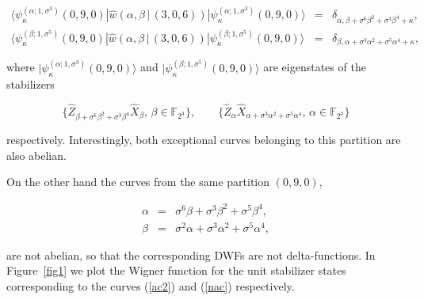 \documentclass[quantumrep,article,submit,pdftex,moreauthors]{Definitions/mdpi}
\begin{document}
\begin{eqnarray}
  \langle \psi_{\kappa}^{(\alpha ; 1,\sigma^{3})}(0,9,0)
  |\hat{w}\left(\alpha,\beta \, | \, (3,0,6)\right)
  |\psi_{\kappa}^{(\alpha ; 1,\sigma^{3})}(0,9,0)\rangle
  &=& \delta_{\alpha,\beta + \sigma^{6}\beta^{2} + \sigma^{3} \beta^{4} +
  \kappa}, \\
  \langle \psi_{\kappa }^{(\beta ; 1,\sigma^{5})}(0,9,0)
  |\hat{w}\left(\alpha,\beta \, | \, (3,0,6)\right)
  |\psi_{\kappa}^{(\beta ; 1,\sigma^{5})}(0,9,0)\rangle
  &=& \delta_{\beta,\alpha + \sigma^{3}\alpha^{2} + \sigma^{5} \alpha^{4} +
  \kappa },
  \label{ac2 delta}
\end{eqnarray}

where $|\psi_{\kappa}^{(\alpha ; 1,\sigma^{3})}(0,9,0)\rangle$ and
$|\psi_{\kappa }^{(\beta ; 1,\sigma^{5})}(0,9,0)\rangle$ are eigenstates of the
stabilizers 

\begin{equation*}
	\{\hat{Z}_{\beta +\sigma ^{6}\beta ^{2}+\sigma^{3}\beta^{4}}
\hat{X}_{\beta }, \, \beta \in \mathbb{F}_{2^{3}}\},
\qquad \{\hat{Z}_{\alpha } \hat{X}_{\alpha + \sigma^{3}\alpha^{2} +
	\sigma^{5}\alpha^{4}}, \, \alpha \in
\mathbb{F}_{2^{3}}\}
\end{equation*}

respectively. Interestingly, both exceptional curves
belonging to this partition are also abelian.

On the other hand the curves from the same partition $(0,9,0)$,

\begin{eqnarray}
  \alpha &=&\sigma^{6}\beta +\sigma ^{3}\beta ^{2}+\sigma ^{5}\beta ^{4},
  \label{nac1} \\
  \beta &=&\sigma^{2}\alpha +\sigma ^{3}\alpha ^{2}+\sigma ^{5}\alpha ^{4},
  \label{nac}
\end{eqnarray}

are not abelian, so that the corresponding DWFs are not delta-functions. In
Figure~\ref{fig1} we plot the Wigner function for the unit stabilizer states
corresponding to the curves (\ref{ac2}) and (\ref{nac}) respectively.
\end{document}
